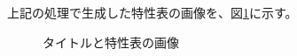 上記の処理で生成した特性表の画像を、図\ref{fig:toku_gazou}に示す。
% 	
\begin{figure}[t]
    \centering
    \caption{タイトルと特性表の画像}
	\label{fig:toku_gazou}
\end{figure}

